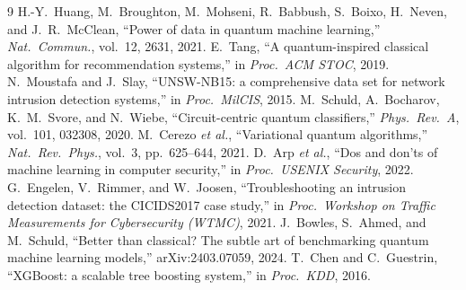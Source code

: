 \IfFileExists{IEEEtran.cls}{\documentclass[conference]{IEEEtran}}{\documentclass[10pt,twocolumn]{article}\usepackage[margin=0.8in]{geometry}}
\begin{document}
\begin{thebibliography}{9}
 H.-Y.~Huang, M.~Broughton, M.~Mohseni, R.~Babbush, S.~Boixo, H.~Neven, and J.~R.~McClean, ``Power of data in quantum machine learning,'' \emph{Nat.\ Commun.}, vol.~12, 2631, 2021.
 E.~Tang, ``A quantum-inspired classical algorithm for recommendation systems,'' in \emph{Proc.\ ACM STOC}, 2019.
 N.~Moustafa and J.~Slay, ``UNSW-NB15: a comprehensive data set for network intrusion detection systems,'' in \emph{Proc.\ MilCIS}, 2015.
 M.~Schuld, A.~Bocharov, K.~M.~Svore, and N.~Wiebe, ``Circuit-centric quantum classifiers,'' \emph{Phys.\ Rev.\ A}, vol.~101, 032308, 2020.
 M.~Cerezo \emph{et al.}, ``Variational quantum algorithms,'' \emph{Nat.\ Rev.\ Phys.}, vol.~3, pp.~625--644, 2021.
 D.~Arp \emph{et al.}, ``Dos and don'ts of machine learning in computer security,'' in \emph{Proc.\ USENIX Security}, 2022.
 G.~Engelen, V.~Rimmer, and W.~Joosen, ``Troubleshooting an intrusion detection dataset: the CICIDS2017 case study,'' in \emph{Proc.\ Workshop on Traffic Measurements for Cybersecurity (WTMC)}, 2021.
 J.~Bowles, S.~Ahmed, and M.~Schuld, ``Better than classical? The subtle art of benchmarking quantum machine learning models,'' arXiv:2403.07059, 2024.
 T.~Chen and C.~Guestrin, ``XGBoost: a scalable tree boosting system,'' in \emph{Proc.\ KDD}, 2016.
\end{thebibliography}
\end{document}
